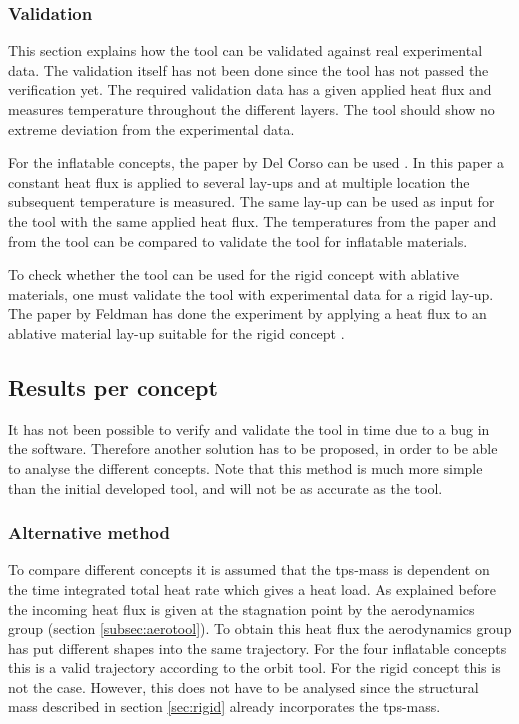 \subsubsection{Validation}
This section explains how the tool can be validated against real experimental data. The validation itself has not been done since the tool has not passed the verification yet. The required validation data has a given applied heat flux and measures temperature throughout the different layers. The tool should show no extreme deviation from the experimental data. 

For the inflatable concepts, the paper by Del Corso can be used \cite{Corso2009}. In this paper a constant heat flux is applied to several lay-ups and at multiple location the subsequent temperature is measured. The same lay-up can be used as input for the tool with the same applied heat flux. The temperatures from the paper and from the tool can be compared to validate the tool for inflatable materials. 

To check whether the tool can be used for the rigid concept with ablative materials, one must validate the tool with experimental data for a rigid lay-up. The paper by Feldman has done the experiment by applying a heat flux to an ablative material lay-up suitable for the rigid concept \cite{Feldman2012}.


\subsection{Results per concept}
It has not been possible to verify and validate the tool in time due to a bug in the software. Therefore another solution has to be proposed, in order to be able to analyse the different concepts. Note that this method is much more simple than the initial developed tool, and will not be as accurate as the tool. 

\subsubsection{Alternative method}
To compare different concepts it is assumed that the \gls{tps}-mass is dependent on the time integrated total heat rate which gives a heat load. As explained before the incoming heat flux is given at the stagnation point by the aerodynamics group (section \ref{subsec:aerotool}). To obtain this heat flux the aerodynamics group has put different shapes into the same trajectory. For the four inflatable concepts this is a valid trajectory according to the orbit tool. For the rigid concept this is not the case. However, this does not have to be analysed since the structural mass described in section \ref{sec:rigid} already incorporates the \gls{tps}-mass.


